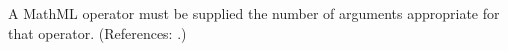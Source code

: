 A MathML operator must be supplied the number of arguments appropriate for
that operator.  (References: .)
